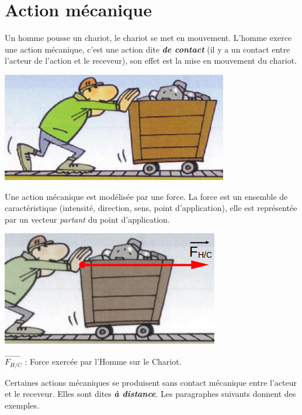 \section{Action mécanique}
%
Un homme pousse un chariot, le chariot se met en mouvement. L'homme exerce une action mécanique,
c'est une action dite \textbf{\textit {de contact}} (il y a un contact entre l'acteur de l'action et le receveur), son effet est la mise en mouvement du chariot.

\begin{center}
\includegraphics[scale=0.6]{./forces/chariotPousse}
\end{center}

Une action mécanique est modélisée par une force. La force est un ensemble de caractéristique (intensité, direction, sens, point d'application), elle est représentée par un vecteur {\it partant} du point d'application.

\begin{center}
\includegraphics[scale=0.6]{./forces/chariotPousseForce}

$\overrightarrow{F_{H/C}}$ : Force exercée par l'Homme sur le Chariot.
\end{center}

Certaines actions mécaniques se produisent sans contact mécanique entre l'acteur et le receveur. Elles sont dites \textbf{\textit {à distance}}. Les paragraphes suivants donnent des exemples.

